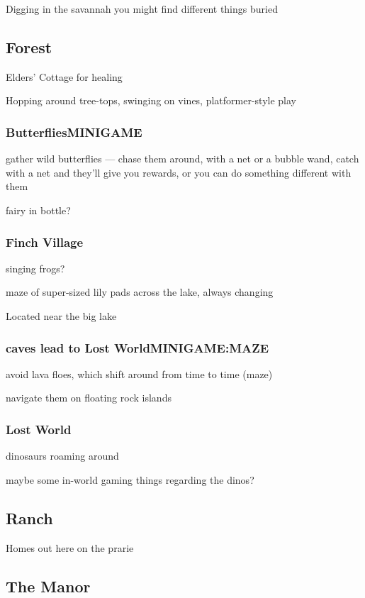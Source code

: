 \documentclass[11pt]{article}
\begin{document}
\begin{enumerate}
Digging in the savannah you might find different things buried
\subsection{Forest}
\label{sec-4-6}


Elders' Cottage for healing

Hopping around tree-tops, swinging on vines, platformer-style play

\subsubsection{Butterflies\hfill{}\textsc{MINIGAME}}
\label{sec-4-6-1}

gather wild butterflies — chase them around, with a net or a bubble
wand, catch with a net and they'll give you rewards, or you can do
something different with them

fairy in bottle?
\subsubsection{Finch Village}
\label{sec-4-6-2}

singing frogs?

maze of super-sized lily pads across the lake, always changing

Located near the big lake

\subsubsection{caves lead to Lost World\hfill{}\textsc{MINIGAME:MAZE}}
\label{sec-4-6-3}

avoid lava floes, which shift around from time to time (maze)

navigate them on floating rock islands
\subsubsection{Lost World}
\label{sec-4-6-4}

dinosaurs roaming around

maybe some in-world gaming things regarding the dinos?
\subsection{Ranch}
\label{sec-4-7}

Homes out here on the prarie
\subsection{The Manor}
\label{sec-4-8}


\end{enumerate}
\end{document}
